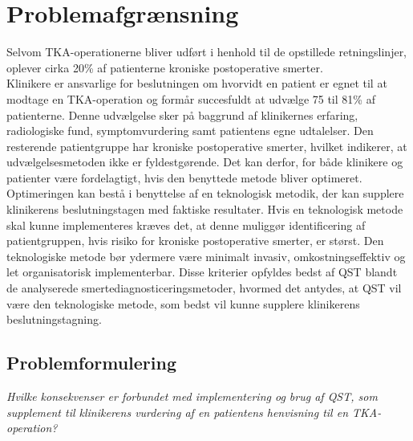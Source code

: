 \section{Problemafgrænsning}
Selvom TKA-operationerne bliver udført i henhold til de opstillede retningslinjer, oplever cirka 20\% af patienterne kroniske postoperative smerter.\\
Klinikere er ansvarlige for beslutningen om hvorvidt en patient er egnet til at modtage en TKA-operation og formår succesfuldt at udvælge 75 til 81\% af patienterne. Denne udvælgelse sker på baggrund af klinikernes erfaring, radiologiske fund, symptomvurdering samt patientens egne udtalelser. Den resterende patientgruppe har kroniske postoperative smerter, hvilket indikerer, at udvælgelsesmetoden ikke er fyldestgørende. Det kan derfor, for både klinikere og patienter være fordelagtigt, hvis den benyttede metode bliver optimeret. Optimeringen kan bestå i benyttelse af en teknologisk metodik, der kan supplere klinikerens beslutningstagen med faktiske resultater. Hvis en teknologisk metode skal kunne implementeres kræves det, at denne muliggør identificering af patientgruppen, hvis risiko for kroniske postoperative smerter, er størst. Den teknologiske metode bør ydermere være minimalt invasiv, omkostningseffektiv og let organisatorisk implementerbar. Disse kriterier opfyldes bedst af QST blandt de analyserede smertediagnosticeringsmetoder, hvormed det antydes, at QST vil være den teknologiske metode, som bedst vil kunne supplere klinikerens beslutningstagning. 

\subsection{Problemformulering}
\begin{center}
	\textit{Hvilke konsekvenser er forbundet med implementering og brug af QST, som supplement til
		klinikerens vurdering af en patientens henvisning til en TKA-operation?}
\end{center}